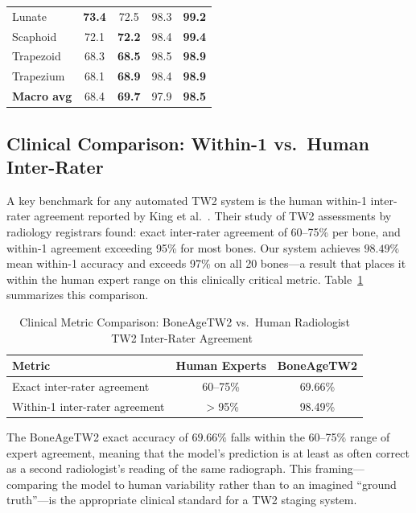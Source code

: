 \documentclass[journal]{IEEEtran}
\begin{document}
\begin{table}[!t]
\begin{tabular}{lcccc}
  Lunate       & \textbf{73.4}     & 72.5     & 98.3     & \textbf{99.2} \\
  Scaphoid     & 72.1     & \textbf{72.2}     & 98.4     & \textbf{99.4} \\
  Trapezoid    & 68.3   & \textbf{68.5}   & 98.5   & \textbf{98.9} \\
  Trapezium    & 68.1   & \textbf{68.9}   & 98.4   & \textbf{98.9} \\
  \midrule
  \textbf{Macro avg} & 68.4 & \textbf{69.7} & 97.9 & \textbf{98.5} \\
  \bottomrule
\end{tabular}
\end{table}

\subsection{Clinical Comparison: Within-1 vs.\ Human Inter-Rater}

A key benchmark for any automated TW2 system is the human
within-1 inter-rater agreement reported by King et al.~\cite{king1994}.
Their study of TW2 assessments by radiology registrars found:
exact inter-rater agreement of 60--75\% per bone, and within-1
agreement exceeding 95\% for most bones.
Our system achieves $98.49\%$ mean within-1 accuracy and exceeds
97\% on all 20 bones—a result that places it within the
human expert range on this clinically critical metric.
Table~\ref{tab:clinical} summarizes this comparison.

\begin{table}[!t]
  \centering
  \caption{Clinical Metric Comparison: BoneAgeTW2 vs.\
    Human Radiologist TW2 Inter-Rater Agreement~\cite{king1994}}
  \label{tab:clinical}
  \begin{tabular}{lcc}
    \toprule
    Metric & Human Experts & BoneAgeTW2 \\
    \midrule
    Exact inter-rater agreement & 60--75\% & 69.66\% \\
    Within-1 inter-rater agreement & $>$95\% & 98.49\% \\
    \bottomrule
  \end{tabular}
\end{table}

The BoneAgeTW2 exact accuracy of $69.66\%$ falls within the
60--75\% range of expert agreement, meaning that the model's
prediction is at least as often correct as a second
radiologist's reading of the same radiograph.
This framing—comparing the model to human variability rather
than to an imagined ``ground truth''—is the appropriate clinical
standard for a TW2 staging system.
\end{document}
